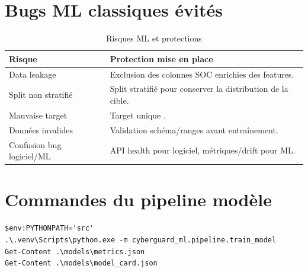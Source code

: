 \section{Bugs ML classiques évités}
\begin{table}[H]
\centering
\caption{Risques ML et protections}
\label{tab:ml_bugs}
\begin{tabularx}{\linewidth}{@{}lY@{}}
\toprule
\textbf{Risque} & \textbf{Protection mise en place}\\
\midrule
Data leakage & Exclusion des colonnes SOC enrichies des features.\\
Split non stratifié & Split stratifié pour conserver la distribution de la cible.\\
Mauvaise target & Target unique .\\
Données invalides & Validation schéma/ranges avant entraînement.\\
Confusion bug logiciel/ML & API health pour logiciel, métriques/drift pour ML.\\
\bottomrule
\end{tabularx}
\end{table}

\section{Commandes du pipeline modèle}
\begin{lstlisting}
$env:PYTHONPATH='src'
.\.venv\Scripts\python.exe -m cyberguard_ml.pipeline.train_model
Get-Content .\models\metrics.json
Get-Content .\models\model_card.json
\end{lstlisting}
